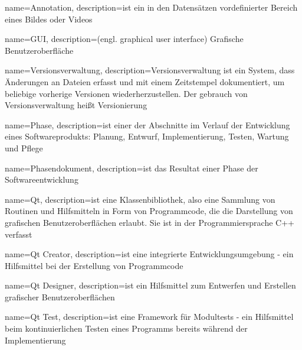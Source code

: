 {
name=Annotation,
description={ist ein in den Datensätzen vordefinierter Bereich eines Bildes oder Videos}
}

{
name=GUI,
description={(engl. graphical user interface) Grafische Benutzeroberfläche}
}

{
name=Versionsverwaltung,
description={Versionsverwaltung ist ein System, dass Änderungen an Dateien erfasst und mit einem Zeitstempel dokumentiert, um beliebige vorherige Versionen wiederherzustellen. Der gebrauch von Versionsverwaltung heißt Versionierung}
}

{
name=Phase,
description={ist einer der Abschnitte im Verlauf der Entwicklung eines Softwareprodukts: Planung, Entwurf, Implementierung, Testen, Wartung und Pflege}
}

{
name=Phasendokument,
description={ist das Resultat einer Phase der Softwareentwicklung}
}

{
name=Qt,
description={ist eine Klassenbibliothek, also eine Sammlung von Routinen und Hilfsmitteln in Form von Programmcode, die die Darstellung von grafischen Benutzeroberflächen erlaubt. Sie ist in der Programmiersprache C++ verfasst}
}

{
name=Qt Creator,
description={ist eine integrierte Entwicklungsumgebung - ein Hilfsmittel bei der Erstellung von Programmcode}
}

{
name=Qt Designer,
description={ist ein Hilfsmittel zum Entwerfen und Erstellen grafischer Benutzeroberflächen}
}

{
name=Qt Test,
description={ist eine Framework für Modultests - ein Hilfsmittel beim kontinuierlichen Testen eines Programms bereits während der Implementierung}
}
